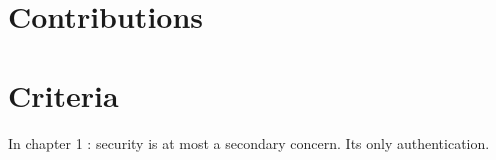 \section{Contributions}

\section{Criteria}






In chapter 1 : security is at most a secondary concern. Its only authentication. 
